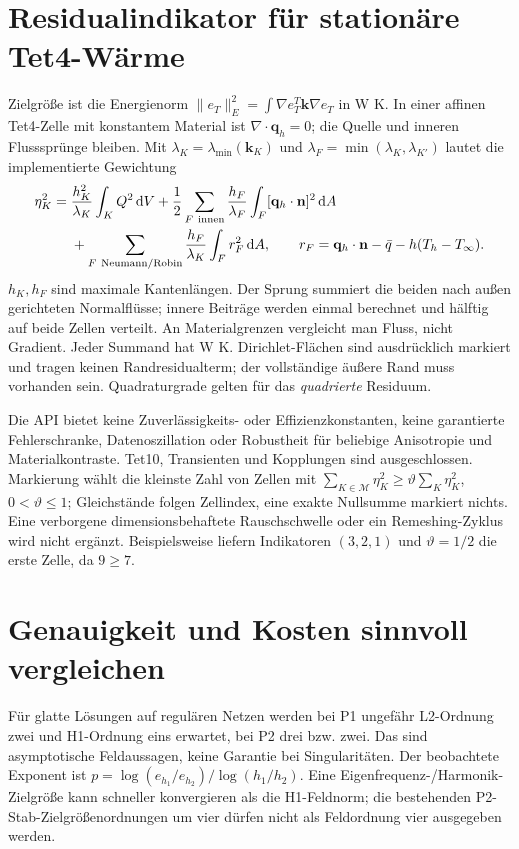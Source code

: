 \section{Residualindikator für stationäre Tet4-Wärme}
Zielgröße ist die Energienorm
$\|e_T\|_E^2=\int\nabla e_T^T\mathbf k\nabla e_T$ in W K.
In einer affinen Tet4-Zelle mit konstantem Material ist
$\nabla\cdot\mathbf q_h=0$; die Quelle und inneren Flusssprünge bleiben.
Mit $\lambda_K=\lambda_{\min}(\mathbf k_K)$ und
$\lambda_F=\min(\lambda_K,\lambda_{K'})$ lautet die implementierte Gewichtung
\begin{align}\label{eq:indicator}
\eta_K^2={}&\frac{h_K^2}{\lambda_K}\int_K Q^2\,\mathrm dV
+\frac12\sum_{F\ {\rm innen}}\frac{h_F}{\lambda_F}
\int_F[\mathbf q_h\cdot\mathbf n]^2\,\mathrm dA\\
&+\sum_{F\ {\rm Neumann/Robin}}\frac{h_F}{\lambda_K}
\int_F r_F^2\,\mathrm dA,\qquad
r_F=\mathbf q_h\cdot\mathbf n-\bar q-h(T_h-T_\infty).\nonumber
\end{align}
$h_K,h_F$ sind maximale Kantenlängen. Der Sprung summiert die beiden nach
außen gerichteten Normalflüsse; innere Beiträge werden einmal berechnet und
hälftig auf beide Zellen verteilt. An Materialgrenzen vergleicht man Fluss,
nicht Gradient. Jeder Summand hat W K. Dirichlet-Flächen sind ausdrücklich
markiert und tragen keinen Randresidualterm; der vollständige äußere Rand
muss vorhanden sein. Quadraturgrade gelten für das \emph{quadrierte} Residuum.

Die API bietet keine Zuverlässigkeits- oder Effizienzkonstanten, keine garantierte
Fehlerschranke, Datenoszillation oder Robustheit für beliebige Anisotropie und
Materialkontraste. Tet10, Transienten und Kopplungen sind ausgeschlossen.
Markierung wählt die kleinste Zahl von Zellen mit
$\sum_{K\in\mathcal M}\eta_K^2\ge\vartheta\sum_K\eta_K^2$, $0<\vartheta\le1$;
Gleichstände folgen Zellindex, eine exakte Nullsumme markiert nichts.
Eine verborgene dimensionsbehaftete Rauschschwelle oder ein Remeshing-Zyklus
wird nicht ergänzt. Beispielsweise liefern Indikatoren $(3,2,1)$ und
$\vartheta=1/2$ die erste Zelle, da $9\ge7$.

\section{Genauigkeit und Kosten sinnvoll vergleichen}
Für glatte Lösungen auf regulären Netzen werden bei P1 ungefähr
L2-Ordnung zwei und H1-Ordnung eins erwartet, bei P2 drei bzw. zwei.
Das sind asymptotische Feldaussagen, keine Garantie bei Singularitäten.
Der beobachtete Exponent ist
$p=\log(e_{h_1}/e_{h_2})/\log(h_1/h_2)$.
Eine Eigenfrequenz-/Harmonik-Zielgröße kann schneller konvergieren als die
H1-Feldnorm; die bestehenden P2-Stab-Zielgrößenordnungen um vier dürfen
nicht als Feldordnung vier ausgegeben werden.

